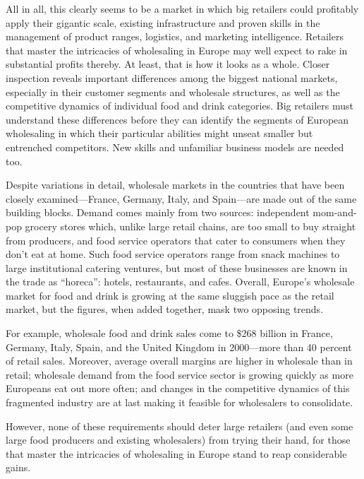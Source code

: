 \begin{listmatch}
\item 
 All in all, this clearly seems to be a market in which big
retailers could profitably apply their gigantic scale, existing infrastructure
and proven skills in the management of product ranges, logistics, and
marketing intelligence. Retailers that master the intricacies of
wholesaling in Europe may well expect to rake in substantial profits
thereby. At least, that is how it looks as a whole. Closer inspection
reveals important differences among the biggest national markets,
especially in their customer segments and wholesale structures, as well
as the competitive dynamics of individual food and drink categories. Big
retailers must understand these differences before they can identify the
segments of European wholesaling in which their particular abilities
might unseat smaller but entrenched competitors. New skills and
unfamiliar business models are needed too.


\item 
 Despite variations in detail, wholesale markets in the countries
that have been closely examined---France, Germany, Italy, and
Spain---are made out of the same building blocks. Demand comes mainly
from two sources: independent mom-and-pop grocery stores which, unlike
large retail chains, are too small to buy straight from producers, and
food service operators that cater to consumers when they don't eat at
home. Such food service operators range from snack machines to large
institutional catering ventures, but most of these businesses are known
in the trade as ``horeca'': hotels, restaurants, and cafes. Overall,
Europe's wholesale market for food and drink is growing at the same
sluggish pace as the retail market, but the figures, when added
together, mask two opposing trends.


\item 
 For example, wholesale food and drink sales come to \$268
billion in France, Germany, Italy, Spain, and the United Kingdom in
2000---more than 40 percent of retail sales. Moreover, average overall
margins are higher in wholesale than in retail; wholesale demand from
the food service sector is growing quickly as more Europeans eat out
more often; and changes in the competitive dynamics of this fragmented
industry are at last making it feasible for wholesalers to consolidate.


\item 
 However, none of these requirements should deter large retailers
(and even some large food producers and existing wholesalers) from
trying their hand, for those that master the intricacies of wholesaling
in Europe stand to reap considerable gains.
\end{listmatch}


